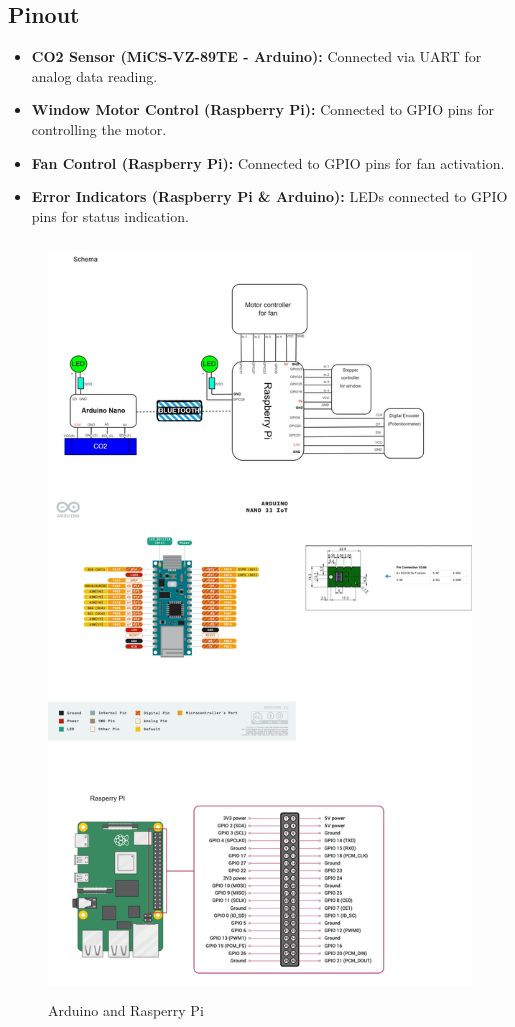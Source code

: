 \subsection{Pinout}
\begin{itemize}
    \item \textbf{CO2 Sensor (MiCS-VZ-89TE - Arduino):} Connected via UART for analog data reading.
    \item \textbf{Window Motor Control (Raspberry Pi):} Connected to GPIO pins for controlling the motor.
    \item \textbf{Fan Control (Raspberry Pi):} Connected to GPIO pins for fan activation.
    \item \textbf{Error Indicators (Raspberry Pi \& Arduino):} LEDs connected to GPIO pins for status indication.
\end{itemize}

\begin{figure}[h]
	\includegraphics[height=200mm,left]{images/RoomVentilation_Cabling.jpg}
	\centering
	\caption{Arduino and Rasperry Pi}
	\label{fig:system}
\end{figure}
